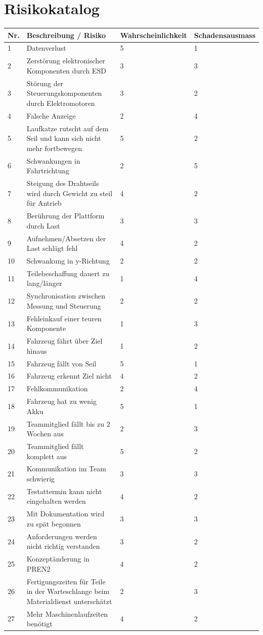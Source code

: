 \documentclass[a4paper]{report}
\begin{document}
\section{Risikokatalog}

\begin{tabular}{|p{}|p{}|p{}|p{}|}
	\hline
	\textbf{Nr.} & \textbf{Beschreibung / Risiko} & \textbf{Wahrscheinlichkeit} & \textbf{Schadensausmass} \\
	\hline
	1 & Datenverlust & 5 & 1 \\
	\hline
	2 & Zerstörung elektronischer Komponenten durch ESD & 3 & 3 \\
	\hline
	3 & Störung der Steuerungskomponenten durch Elektromotoren & 3 & 2 \\
	\hline
	4 & Falsche Anzeige & 2 & 4 \\
	\hline
	5 & Laufkatze rutscht auf dem Seil und kann sich nicht mehr fortbewegen & 5 & 2 \\
	\hline
	6 & Schwankungen in Fahrtrichtung & 2 & 5 \\
	\hline
	7 & Steigung des Drahtseils wird durch Gewicht zu steil für Antrieb & 4 & 2 \\
	\hline
	8 & Berührung der Plattform durch Last & 3 & 3 \\
	\hline
	9 & Aufnehmen/Absetzen der Last schlägt fehl & 4 & 2 \\
	\hline
	10 & Schwankung in y-Richtung & 2 & 2 \\
	\hline
	11 & Teilebeschaffung dauert zu lang/länger & 1 & 4 \\
	\hline
	12 & Synchronisation zwischen Messung und Steuerung & 2 & 2 \\
	\hline
	13 & Fehleinkauf einer teuren Komponente & 1 & 3 \\
	\hline
	14 & Fahrzeug fährt über Ziel hinaus & 1 & 2 \\
	\hline
	15 & Fahrzeug fällt von Seil & 5 & 1 \\
	\hline
	16 & Fahrzeug erkennt Ziel nicht & 4 & 2 \\
	\hline
	17 & Fehlkommunikation & 2 & 4 \\
	\hline
	18 & Fahrzeug hat zu wenig Akku & 5 & 1 \\
	\hline
	19 & Teammitglied fällt bis zu 2 Wochen aus & 2 & 3 \\
	\hline
	20 & Teammitglied fällt komplett aus & 5 & 2 \\
	\hline
	21 & Kommunikation im Team schwierig & 3 & 3 \\
	\hline
	22 & Testattermin kann nicht eingehalten werden & 4 & 2 \\
	\hline
	23 & Mit Dokumentation wird zu spät begonnen & 3 & 3 \\
	\hline
	24 & Anforderungen werden nicht richtig verstanden & 3 & 2 \\
	\hline
	25 & Konzeptänderung in PREN2 & 4 & 2 \\
	\hline
	26 & Fertigungszeiten für Teile in der Warteschlange beim Materialdienst unterschätzt & 2 & 3 \\
	\hline
	27 & Mehr Maschinenlaufzeiten benötigt & 4 & 2 \\
	\hline
\end{tabular}
\end{document}
